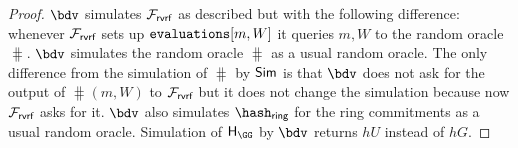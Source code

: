 \begin{proof}
	
	$ \bdv $ simulates $ \mathcal{F}_{\textsf{rvrf}} $ as described but with the following difference: whenever $ \mathcal{F}_{\textsf{rvrf}} $ sets up $ \texttt{evaluations}[m,W] $ it queries $ m,W $ to the random oracle $ \hash $. $ \bdv $ simulates the random oracle $ \hash $  as a usual random oracle.
	The only difference from the simulation of $ \hash $ by $ \mathsf{Sim} $ is that $ \bdv $ does not ask for the output of $ \hash(m,W) $ to $ \mathcal{F}_{\textsf{rvrf}} $ but it does not change the simulation because now $\mathcal{F}_{\textsf{rvrf}} $ asks for it.  
	$ \bdv $ also simulates $ \hash_\ring $ for the ring commitments as a usual random oracle. 			
	Simulation of $ \hashG $ by $ \bdv $ returns $ hU $ instead of $ hG $. 
	
	

\end{proof}
